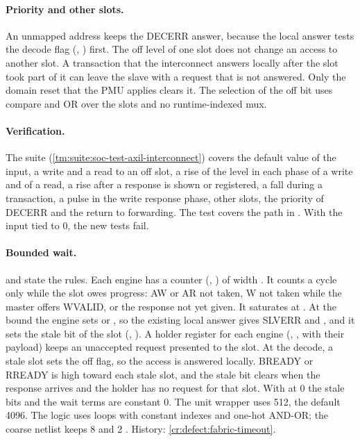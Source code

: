 \paragraph{Priority and other slots.} An unmapped address keeps the DECERR answer, because the local answer tests the decode flag (, ) first. The off level of one slot does not change an access to another slot. A transaction that the interconnect answers locally after the slot took part of it can leave the slave with a request that is not answered. Only the domain reset that the PMU applies clears it. The selection of the off bit uses compare and OR over the slots and no runtime-indexed mux.

\paragraph{Verification.} The suite  (\cref{tm:suite:soc-test-axil-interconnect}) covers the default value of the input, a write and a read to an off slot, a rise of the level in each phase of a write and of a read, a rise after a response is shown or registered, a fall during a transaction, a pulse in the write response phase, other slots, the priority of DECERR and the return to forwarding. The test  covers the path in . With the input tied to 0, the new tests fail.

\paragraph{Bounded wait.}  and  state the rules. Each engine has a counter (, ) of width . It counts a cycle only while the slot owes progress: AW or AR not taken, W not taken while the master offers WVALID, or the response not yet given. It saturates at . At the bound the engine sets  or , so the existing local answer gives SLVERR and , and it sets the stale bit of the slot (, ). A holder register for each engine (, ,  with their payload) keeps an unaccepted request presented to the slot. At the decode, a stale slot sets the off flag, so the access is answered locally. BREADY or RREADY is high toward each stale slot, and the stale bit clears when the response arrives and the holder has no request for that slot. With  at 0 the stale bits and the wait terms are constant 0. The unit wrapper uses 512,  the default 4096. The logic uses loops with constant indexes and one-hot AND-OR; the coarse netlist keeps 8  and 2 . History: \cref{cr:defect:fabric-timeout}.

